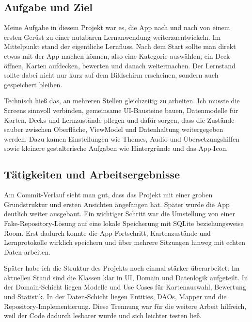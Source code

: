 \documentclass{Vorlage}
\begin{document}

\subsection{Aufgabe und Ziel}

Meine Aufgabe in diesem Projekt war es, die App nach und nach von einem ersten Ger\"ust zu einer nutzbaren Lernanwendung weiterzuentwickeln. Im Mittelpunkt stand der eigentliche Lernfluss. Nach dem Start sollte man direkt etwas mit der App machen k\"onnen, also eine Kategorie ausw\"ahlen, ein Deck \"offnen, Karten aufdecken, bewerten und danach weitermachen. Der Lernstand sollte dabei nicht nur kurz auf dem Bildschirm erscheinen, sondern auch gespeichert bleiben.

Technisch hie\ss{} das, an mehreren Stellen gleichzeitig zu arbeiten. Ich musste die Screens sinnvoll verbinden, gemeinsame UI-Bausteine bauen, Datenmodelle f\"ur Karten, Decks und Lernzust\"ande pflegen und daf\"ur sorgen, dass die Zust\"ande sauber zwischen Oberfl\"ache, ViewModel und Datenhaltung weitergegeben werden. Dazu kamen Einstellungen wie Themes, Audio und \"Ubersetzungshilfen sowie kleinere gestalterische Aufgaben wie Hintergr\"unde und das App-Icon.

\subsection{T\"atigkeiten und Arbeitsergebnisse}

Am Commit-Verlauf sieht man gut, dass das Projekt mit einer groben Grundstruktur und ersten Ansichten angefangen hat. Sp\"ater wurde die App deutlich weiter ausgebaut. Ein wichtiger Schritt war die Umstellung von einer Fake-Repository-L\"osung auf eine lokale Speicherung mit SQLite beziehungsweise Room. Erst dadurch konnte die App Fortschritt, Kartenzust\"ande und Lernprotokolle wirklich speichern und \"uber mehrere Sitzungen hinweg mit echten Daten arbeiten.

Sp\"ater habe ich die Struktur des Projekts noch einmal st\"arker \"uberarbeitet. Im aktuellen Stand sind die Klassen klar in UI, Domain und Datenlogik aufgeteilt. In der Domain-Schicht liegen Modelle und Use Cases f\"ur Kartenauswahl, Bewertung und Statistik. In der Daten-Schicht liegen Entities, DAOs, Mapper und die Repository-Implementierung. Diese Trennung war f\"ur die weitere Arbeit hilfreich, weil der Code dadurch lesbarer wurde und sich leichter testen lie\ss{}.
\end{document}
